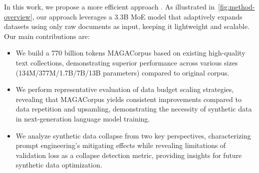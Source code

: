 In this work, we propose a more efficient approach {\ours}. As illustrated in~\autoref{fig:method-overview}, our approach leverages a 3.3B MoE model that adaptively expands datasets using only raw documents as input, keeping it lightweight and scalable.
Our main contributions are:
\begin{itemize}[leftmargin=1.5em]
\item We build a 770 billion tokens MAGACorpus based on existing high-quality text collections, demonstrating superior performance across various sizes (134M/377M/1.7B/7B/13B parameters) compared to original corpus.
\item We perform representative evaluation of data budget scaling strategies, revealing that MAGACorpus yields consistent improvements compared to data repetition and upsamling, demonstrating the necessity of synthetic data in next-generation language model training.
\item We analyze synthetic data collapse from two key perspectives, characterizing prompt engineering's mitigating effects while revealing limitations of validation loss as a collapse detection metric, providing insights for future synthetic data optimization.
\end{itemize}
